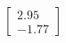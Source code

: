 \documentclass[preview]{standalone}
\begin{document}
\begin{align*}
\begin{bmatrix} 2.95 \\ -1.77 \end{bmatrix}
\end{align*}
\end{document}
